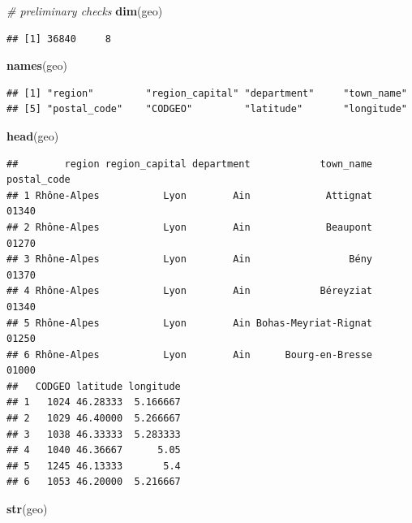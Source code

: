 \documentclass[]{article}
\newenvironment{Shaded}{\begin{snugshade}}{\end{snugshade}}
\newcommand{\KeywordTok}[1]{\textcolor[rgb]{0.13,0.29,0.53}{\textbf{#1}}}
\newcommand{\CommentTok}[1]{\textcolor[rgb]{0.56,0.35,0.01}{\textit{#1}}}
\newcommand{\NormalTok}[1]{#1}
\begin{document}
\begin{Shaded}
\begin{Highlighting}[]
\CommentTok{# preliminary checks}
\KeywordTok{dim}\NormalTok{(geo)}
\end{Highlighting}
\end{Shaded}

\begin{verbatim}
## [1] 36840     8
\end{verbatim}

\begin{Shaded}
\begin{Highlighting}[]
\KeywordTok{names}\NormalTok{(geo)}
\end{Highlighting}
\end{Shaded}

\begin{verbatim}
## [1] "region"         "region_capital" "department"     "town_name"     
## [5] "postal_code"    "CODGEO"         "latitude"       "longitude"
\end{verbatim}

\begin{Shaded}
\begin{Highlighting}[]
\KeywordTok{head}\NormalTok{(geo)}
\end{Highlighting}
\end{Shaded}

\begin{verbatim}
##        region region_capital department            town_name postal_code
## 1 Rhône-Alpes           Lyon        Ain             Attignat       01340
## 2 Rhône-Alpes           Lyon        Ain             Beaupont       01270
## 3 Rhône-Alpes           Lyon        Ain                 Bény       01370
## 4 Rhône-Alpes           Lyon        Ain            Béreyziat       01340
## 5 Rhône-Alpes           Lyon        Ain Bohas-Meyriat-Rignat       01250
## 6 Rhône-Alpes           Lyon        Ain      Bourg-en-Bresse       01000
##   CODGEO latitude longitude
## 1   1024 46.28333  5.166667
## 2   1029 46.40000  5.266667
## 3   1038 46.33333  5.283333
## 4   1040 46.36667      5.05
## 5   1245 46.13333       5.4
## 6   1053 46.20000  5.216667
\end{verbatim}

\begin{Shaded}
\begin{Highlighting}[]
\KeywordTok{str}\NormalTok{(geo)}
\end{Highlighting}
\end{Shaded}
\end{document}
